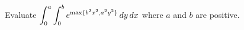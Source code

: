 Evaluate
$\displaystyle{\int_0^a\int_0^b e^{{\rm max}\{b^2x^2, a^2y^2\}}\,dy\,dx}$
where $a$ and $b$ are positive.
